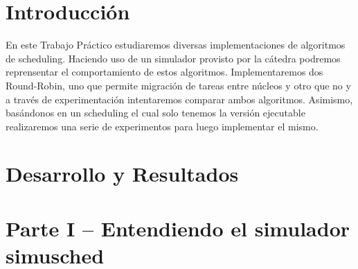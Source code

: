 \documentclass[a4paper,10pt,twoside]{article}
\begin{document}
\newpage




\tableofcontents

\newpage




\section{Introducción}

\indent \indent En este Trabajo Práctico estudiaremos diversas implementaciones de algoritmos de scheduling. 
Haciendo uso de un simulador provisto por la cátedra podremos reprensentar el comportamiento de estos algoritmos. 
Implementaremos dos Round-Robin, uno que permite migración de tareas entre núcleos y otro que no y a través de experimentación intentaremos comparar ambos algoritmos. 
Asimismo, basándonos en un scheduling el cual solo tenemos la versión ejecutable realizaremos una serie de experimentos para luego implementar el mismo.\\


\newpage
\section{Desarrollo y Resultados}

\section{Parte I – Entendiendo el simulador simusched}


\newpage
\end{document}
